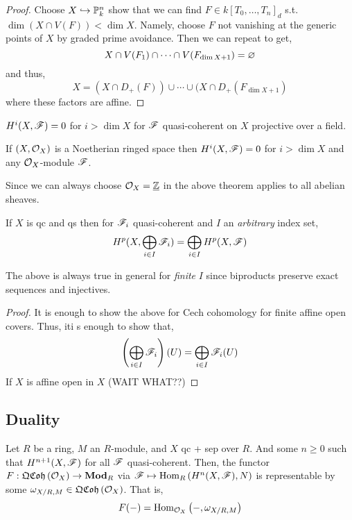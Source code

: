 \documentclass[12pt]{article}
\begin{document}
\begin{proof}
Choose $X \hookrightarrow \mathbb{P}^n_k$ show that we can find $F \in k[T_0, \dots, T_n]_{d}$ s.t. $\dim{(X \cap V(F))} < \dim{X}$. Namely, choose $F$ not vanishing at the generic points of $X$ by graded prime avoidance. Then we can repeat to get,
\[ X \cap V(F_1) \cap \cdots \cap V(F_{\dim{X} + 1}) = \varnothing \]
and thus,
\[ X = (X \cap D_+(F)) \cup \cdots \cup (X \cap D_+(F_{\dim{X}+1}) \]
where these factors are affine. 
\end{proof}

\begin{cor}
$H^i(X, \mathscr{F}) = 0$ for $i > \dim{X}$ for $\mathscr{F}$ quasi-coherent on $X$ projective over a field.
\end{cor}

\begin{theorem}[Grothendieck]
If $(X, \mathcal{O}_{X})$ is a Noetherian ringed space then $H^i(X, \mathscr{F}) = 0$ for $i > \dim{X}$ and any $\mathcal{O}_{X}$-module $\mathscr{F}$. 
\end{theorem}

\begin{rmk}
Since we can always choose $\mathcal{O}_{X} = \underline{\mathbb{Z}}$ in the above theorem applies to all abelian sheaves. 
\end{rmk}

\begin{lemma}
If $X$ is qc and qs then for $\mathscr{F}_i$ quasi-coherent and $I$ an \textit{arbitrary} index set,
\[ H^p(X, \bigoplus_{i \in I} \mathscr{F}_i) = \bigoplus_{i \in I} H^p(X, \mathscr{F}) \]
\end{lemma}

\begin{rmk}
The above is always true in general for \textit{finite} $I$ since biproducts preserve exact sequences and injectives.
\end{rmk}

\begin{proof}
It is enough to show the above for Cech cohomology for finite affine open covers. Thus, iti s enough to show that,
\[ \left( \bigoplus_{i \in I} \mathscr{F}_i \right)(U) = \bigoplus_{i \in I} \mathscr{F}_i(U) \]
If $X$ is affine open in $X$ (WAIT WHAT??)
\end{proof}

\subsection{Duality}

\begin{lemma}
Let $R$ be a ring, $M$ an $R$-module, and $X$ qc + sep over $R$. And some $n \ge 0$ such that $H^{n+1}(X, \mathscr{F})$ for all $\mathscr{F}$ quasi-coherent. Then, the functor $F : \mathfrak{QCoh}\left(\mathcal{O}_{X}\right) \to \mathbf{Mod}_{R}$ via $\mathscr{F} \mapsto \mathrm{Hom}_{R} \left( H^n(X, \mathscr{F}), N \right)$ is representable by some $\omega_{X/R, M} \in \mathfrak{QCoh}\left(\mathcal{O}_{X}\right)$. That is,
\[ F(-) = \mathrm{Hom}_{\mathcal{O}_{X}} \left( -, \omega_{X / R, M} \right) \]
\end{lemma}
\end{document}
